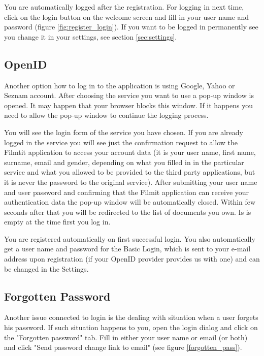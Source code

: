 You are automatically logged after the registration. For logging in next time, click on the login button on the welcome screen and fill in your user name and password (figure \ref{fig:register_login}). If you want to be logged in permanently see you change it in your settings, see section \ref{sec:settings}.

\subsection{OpenID}

Another option how to log in to the application is using Google, Yahoo or Seznam account. After choosing the service you want to use a pop-up window is opened. It may happen that your browser blocks this window. If it happens you need to allow the pop-up window to continue the logging process.

You will see the login form of the service you have chosen. If you are already logged in the service you will see just the confirmation request to allow the Filmtit application to access your account data (it is your user name, first name, surname, email and gender, depending on what you filled in in the particular service and what you allowed to be provided to the third party applications, but it is never the password to the original service). After submitting your user name and user password and confirming that the Filmit application can receive your authentication data the pop-up window will be automatically closed. Within few seconds after that you will be redirected to the list of documents you own. Is is empty at the time first you log in.

You are registered automatically on first successful login. You also automatically get a user name and password for the Basic Login, which is sent to your e-mail address upon registration (if your OpenID provider provides us with one) and can be changed in the Settings.

\subsection{Forgotten Password}

Another issue connected to login is the dealing with situation when a user forgets his password. If such situation happens to you, open the login dialog and click on the "Forgotten password" tab. Fill in either your user name or email (or both) and click "Send password change link to email" (see figure \ref{forgotten_pass}).

